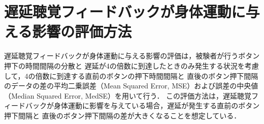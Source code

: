 \section{遅延聴覚フィードバックが身体運動に与える影響の評価方法}
遅延聴覚フィードバックが身体運動に与える影響の評価は，被験者が行うボタン押下の時間間隔の分散と
遅延が4の倍数に到達したときのみ発生する状況を考慮して，4の倍数に到達する直前のボタンの押下時間間隔と
直後のボタン押下間隔のデータの差の平均二乗誤差（Mean Squared Error, MSE）および誤差の中央値（Median Squared Error, MedSE）を用いて行う．
この評価方法は，遅延聴覚フィードバックが身体運動に影響を与えている場合，遅延が発生する直前のボタン押下間隔と
直後のボタン押下間隔の差が大きくなることを想定している．
